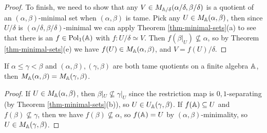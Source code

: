 \begin{appendices}
\begin{proof}
To finish, we need to show that any $V \in M_{\mathbb{A}/\delta}(\alpha/\delta,\beta/\delta)$ is a quotient of an $(\alpha,\beta)$-minimal set when $(\alpha,\beta)$ is tame. Pick any $U \in M_{\mathbb{A}}(\alpha,\beta)$, then since $U/\delta$ is $(\alpha/\delta,\beta/\delta)$-minimal we can apply Theorem \ref{thm-minimal-sets}(a) to see that there is an $f \in \operatorname{Pol}_1(\mathbb{A})$ with $f : U/\delta \simeq V$. Then $f(\beta|_U) \not\subseteq \alpha$, so by Theorem \ref{thm-minimal-sets}(e) we have $f(U) \in M_{\mathbb{A}}(\alpha,\beta)$, and $V = f(U)/\delta$.
\end{proof}

\begin{prop} If $\alpha \le \gamma < \beta$ and $(\alpha,\beta), (\gamma,\beta)$ are both tame quotients on a finite algebra $\mathbb{A}$, then $M_{\mathbb{A}}(\alpha,\beta) = M_{\mathbb{A}}(\gamma,\beta)$.
\end{prop}
\begin{proof} If $U \in M_{\mathbb{A}}(\alpha,\beta)$, then $\beta|_U \not\subseteq \gamma|_U$ since the restriction map is $0,1$-separating (by Theorem \ref{thm-minimal-sets}(b)), so $U \in U_{\mathbb{A}}(\gamma,\beta)$. If $f(\mathbb{A}) \subseteq U$ and $f(\beta) \not\subseteq \gamma$, then we have $f(\beta) \not\subseteq \alpha$, so $f(\mathbb{A}) = U$ by $(\alpha,\beta)$-minimality, so $U \in M_{\mathbb{A}}(\gamma,\beta)$.


\end{proof}
\end{appendices}
